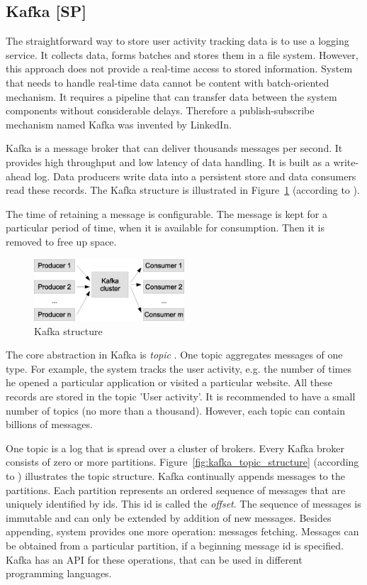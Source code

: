 \subsection{Kafka [SP]}
\label{subs:kafka}

The straightforward way to store user activity tracking data is to use a logging service.
It collects data, forms batches and stores them in a file system.
However, this approach does not provide a real-time access to stored information.
System that needs to handle real-time data cannot be content with batch-oriented mechanism.
It requires a pipeline that can transfer data between the system components without considerable delays.
Therefore a publish-subscribe mechanism named Kafka was invented by LinkedIn.

Kafka is a message broker that can deliver thousands messages per second. 
It provides high throughput and low latency of data handling.
It is built as a write-ahead log.
Data producers write data into a persistent store and data consumers read these records.
The Kafka structure is illustrated in Figure~\ref{fig:kafka_structure} (according to \cite{Kafka}).

The time of retaining a message is configurable.
The message is kept for a particular period of time, when it is available for consumption.
Then it is removed to free up space.

\begin{figure}[h]
  \centering
  \includegraphics [width=0.5\textwidth]{images/kafka_structure}
  \caption{Kafka structure}
  \label{fig:kafka_structure}
\end{figure} 

The core abstraction in Kafka is \textit{topic} \cite{Goodhope2012}.
One topic aggregates messages of one type.
For example, the system tracks the user activity, e.g. the number of times he opened a particular application or visited a particular website.
All these records are stored in the topic 'User activity'.
It is recommended to have a small number of topics (no more than a thousand).
However, each topic can contain billions of messages.

One topic is a log that is spread over a cluster of brokers.
Every Kafka broker consists of zero or more partitions.
Figure~\ref{fig:kafka_topic_structure} (according to \cite{Kafka}) illustrates the topic structure.
Kafka continually appends messages to the partitions.
Each partition represents an ordered sequence of messages that are uniquely identified by ids.
This id is called the \textit{offset}.
The sequence of messages is immutable and can only be extended by addition of new messages.
Besides appending, system provides one more operation: messages fetching.
Messages can be obtained from a particular partition, if a beginning message id is specified.
Kafka has an API for these operations, that can be used in different programming languages.

